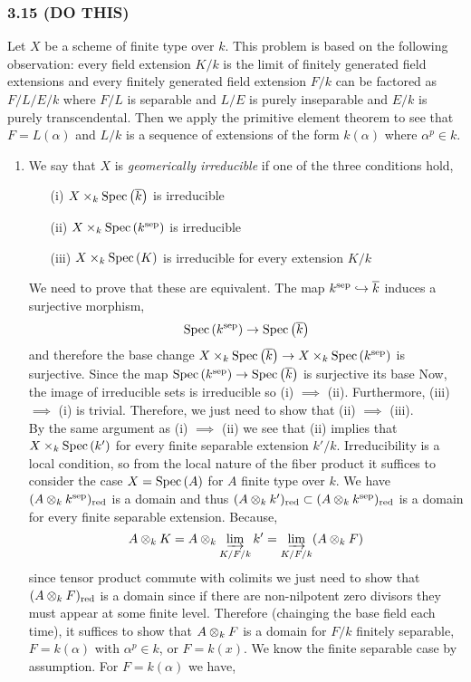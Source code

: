 \documentclass[12pt]{article}
\begin{document}
\subsubsection{3.15 (DO THIS)}

Let $X$ be a scheme of finite type over $k$. This problem is based on the following observation: every field extension $K / k$ is the limit of finitely generated field extensions and every finitely generated field extension $F / k$ can be factored as $F / L / E / k$ where $F/L$ is separable and $L/E$ is purely inseparable and $E / k$ is purely transcendental. Then we apply the primitive element theorem to see that $F = L(\alpha)$ and $L/k$ is a sequence of extensions of the form $k(\alpha)$ where $\alpha^p \in k$.

\begin{enumerate}
\item We say that $X$ is \textit{geomerically irreducible} if one of the three conditions hold,
\begin{enumerate}
\item[(i)] $X \times_k \mathrm{Spec}\left( \overline{k} \right)$ is irreducible
\item[(ii)] $X \times_k \mathrm{Spec}\left( k^{\text{sep}} \right)$ is irreducible
\item[(iii)] $X \times_k \mathrm{Spec}\left( K \right)$ is irreducible for every extension $K / k$
\end{enumerate}
We need to prove that these are equivalent. 
The map $k^{\text{sep}} \hookrightarrow \overline{k}$ induces a surjective morphism,
\[ \mathrm{Spec}\left( k^{\text{sep}} \right) \to \mathrm{Spec}\left( \overline{k} \right)  \]
and therefore the base change $X \times_k \mathrm{Spec}\left( \overline{k} \right) \to X \times_k \mathrm{Spec}\left( k^{\text{sep}} \right)$ is surjective. Since the map $\mathrm{Spec}\left( k^{\text{sep}} \right) \to \mathrm{Spec}\left( \overline{k} \right)$ is surjective its base Now, the image of irreducible sets is irreducible so (i) $\implies$ (ii). Furthermore, (iii) $\implies$ (i) is trivial. Therefore, we just need to show that (ii) $\implies$ (iii).
\bigskip\\
By the same argument as (i) $\implies$ (ii) we see that (ii) implies that $X \times_k \mathrm{Spec}\left( k' \right)$ for every finite separable extension $k'/k$. Irreducibility is a local condition, so from the local nature of the fiber product it suffices to consider the case $X = \mathrm{Spec}\left( A \right)$ for $A$ finite type over $k$. We have $(A \otimes_k k^{\mathrm{sep}})_{\mathrm{red}}$ is a domain and thus $(A \otimes_k k')_{\mathrm{red}} \subset (A \otimes_k k^{\mathrm{sep}})_{\mathrm{red}}$ is a domain for every finite separable extension. Because,
\[ A \otimes_k K = A \otimes_k \varinjlim_{K/F/k} k' = \varinjlim_{K/F/k} (A \otimes_k F) \]
since tensor product commute with colimits we just need to show that $(A \otimes_k F)_{\mathrm{red}}$ is a domain since if there are non-nilpotent zero divisors they must appear at some finite level. Therefore (chainging the base field each time), it suffices to show that $A \otimes_k F$ is a domain for $F/k$ finitely separable, $F = k(\alpha)$ with $\alpha^p \in k$, or $F = k(x)$. We know the finite separable case by assumption. For $F = k(\alpha)$ we have,

\end{enumerate}
\end{document}
